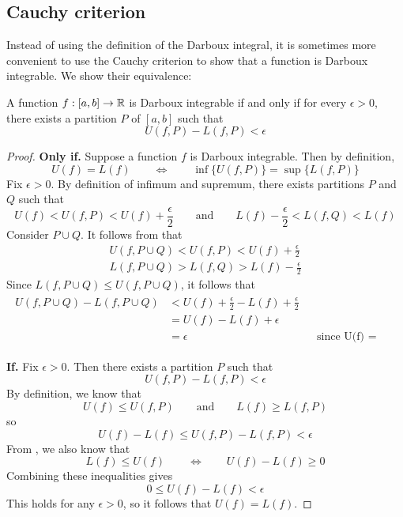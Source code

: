 
\subsection{Cauchy criterion}
Instead of using the definition of the Darboux integral, it is sometimes more convenient to use the Cauchy criterion to show that a function is Darboux integrable. We show their equivalence:
\begin{definition}
  A function $f: [a, b] \to \mathbb{R}$ is Darboux integrable if and only if for every $\epsilon > 0$, there exists a partition $P$ of $[a, b]$ such that
  \[
    U(f, P) - L(f, P) < \epsilon
  \]
\end{definition}
\begin{proof}
  \textbf{Only if.} Suppose a function $f$ is Darboux integrable. Then by definition,
  \[
    U(f) = L(f) \qquad \iff \qquad \inf\{U(f, P)\} = \sup\{L(f, P)\}
  \]
  Fix $\epsilon > 0$. By definition of infimum and supremum, there exists partitions $P$ and $Q$ such that
  \[
    U(f) < U(f, P) < U(f) + \frac{\epsilon}{2} \qquad \text{and} \qquad L(f) - \frac{\epsilon}{2} < L(f, Q) < L(f)
  \]
  Consider $P \cup Q$. It follows from  that
  \begin{align*}
    U(f, P \cup Q) < U(f, P) < U(f) + \frac{\epsilon}{2} \\ 
    L(f, P \cup Q) > L(f, Q) > L(f) - \frac{\epsilon}{2}
  \end{align*}
  Since $L(f, P \cup Q) \leq U(f, P \cup Q)$, it follows that
  \begin{align*}
    \begin{aligned}
      U(f, P \cup Q) - L(f, P \cup Q) &< U(f) + \frac{\epsilon}{2} - L(f) + \frac{\epsilon}{2} \\ 
      &= U(f) - L(f) + \epsilon \\ 
      &= \epsilon && \text{since U(f) = L(f)}
    \end{aligned}
  \end{align*}

  \textbf{If.} Fix $\epsilon > 0$. Then there exists a partition $P$ such that
  \[
    U(f, P) - L(f, P) < \epsilon
  \]
  By definition, we know that
  \[
    U(f) \leq U(f, P) \qquad \text{and} \qquad L(f) \geq L(f, P)
  \]
  so
  \[
    U(f) - L(f) \leq U(f, P) - L(f, P) < \epsilon
  \]
  From , we also know that 
  \[
    L(f) \leq U(f) \qquad \iff \qquad U(f) - L(f) \geq 0
  \]
  Combining these inequalities gives
  \[
    0 \leq U(f) - L(f) < \epsilon
  \]
  This holds for any $\epsilon > 0$, so it follows that $U(f) = L(f)$.
\end{proof}
